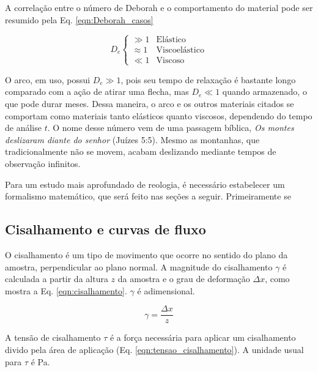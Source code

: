 		A correlação entre o número de Deborah e o comportamento do material pode ser resumido pela Eq. \ref{eqn:Deborah_casos}
		
		\begin{equation}
			D_e
			\begin{cases}
				\gg 1     & \textrm{Elástico}      \\
				\approx 1 & \textrm{Viscoelástico} \\
				\ll 1     & \textrm{Viscoso}
			\end{cases}
			\label{eqn:Deborah_casos}
		\end{equation}
		
		O arco, em uso, possui \(D_e \gg 1\), pois seu tempo de relaxação é bastante longo comparado com a ação de atirar uma flecha, mas \(D_e \ll 1\) quando armazenado, o que pode durar meses. Dessa maneira, o arco e os outros materiais citados se comportam como materiais tanto elásticos quanto viscosos, dependendo do tempo de análise \(t\). O nome desse número vem de uma passagem bíblica, \emph{Os montes deslizaram diante do senhor} (Juízes 5:5). Mesmo as montanhas, que tradicionalmente não se movem, acabam deslizando mediante tempos de observação infinitos.
		
		Para um estudo mais aprofundado de reologia, é necessário estabelecer um formalismo matemático, que será feito nas seções a seguir. Primeiramente se
		
			\subsection{Cisalhamento e curvas de fluxo}
			
			O cisalhamento é um tipo de movimento que ocorre no sentido do plano da amostra, perpendicular ao plano normal. A magnitude do cisalhamento \(\gamma\) é calculada a partir da altura \(z\) da amostra e o grau de deformação \(\Delta x\), como mostra a Eq. \ref{eqn:cisalhamento}. \(\gamma\) é adimensional.
			
			\begin{equation}  %
				\gamma = \frac{\Delta x}{z}
				\label{eqn:cisalhamento}
			\end{equation}
			
			A tensão de cisalhamento \(\tau\) é a força necessária para aplicar um cisalhamento divido pela área de aplicação (Eq. \ref{eqn:tensao_cisalhamento}). A unidade usual para \(\tau\) é Pa.
			
